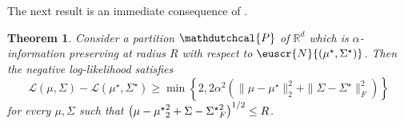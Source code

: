 \documentclass[11pt,letterpaper]{article}
\theoremstyle{plain}
\newtheorem{theorem}{Theorem}[section]
\theoremstyle{definition}
\theoremstyle{remark}
\newcommand{\inbrace}[1]{\ensuremath{\left\{#1\right\}}}
\newcommand{\inparen}[1]{\ensuremath{\left(#1\right)}}
\let\norm\relax
\newcommand{\norm}[1]{\ensuremath{\left\lVert #1 \right\rVert}}
\newcommand{\R}{\mathbb{R}}
\newcommand{\sfrac}[2]{{#1/#2}}
\newcommand{\customcal}[1]{\euscr{#1}}
\newcommand{\cN}{\customcal{N}}
\newcommand{\negLL}{\ensuremath{\mathscr{L}}}
\newcommand{\hypo}[1]{\mathdutchcal{#1}}
\newcommand{\hyL}{\hypo{L}}
\newcommand{\hyP}{\hypo{P}}
\newcommand{\normal}[2]{\cN{\inparen{#1,#2}}}
\newcommand{\muStar}{{\mu^\star}}
\newcommand{\SigmaStar}{{\Sigma^\star}}
\renewcommand{\hyL}{\negLL}
\begin{document}
{       The next result is an immediate consequence of .
        \begin{theorem}
        \label{thm:info-pres-implies-strong-conv}
        Consider a partition $\hyP$ of $\R^d$ which is $\alpha$-information preserving at radius $R$ with respect to $\normal{\mu^\star}{\Sigma^\star}$. Then the negative log-likelihood satisfies
        \[
        \hyL(\mu, \Sigma)
        -
        \hyL(\mu^\star, \Sigma^\star) 
        \geq  
        \min \inbrace{
            2, 
            2\alpha^2 \inparen{\|\mu - \mu^\star\|_2^2 + \|\Sigma - \Sigma^\star\|_{F}^2}} 
        \]
        for every $\mu, \Sigma$ such that $\inparen{\norm{\mu-\muStar}_2^2 + \norm{\Sigma-\SigmaStar}_F^2}^{\sfrac12}\leq R$. 
        \end{theorem}
        
}
\end{document}
